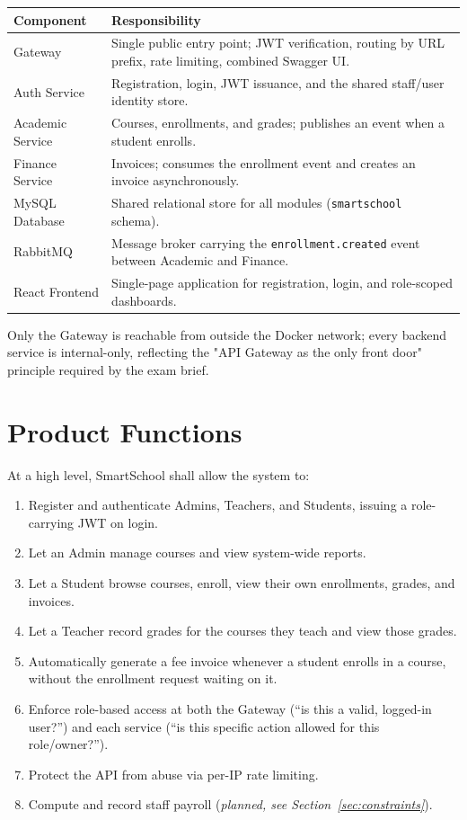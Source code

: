 \documentclass[11pt,a4paper]{report}
\newcommand{\sysname}{SmartSchool}
\begin{document}
\begin{center}
\begin{tabular}{@{}p{3.4cm}p{10.6cm}@{}}
\toprule
\textbf{Component} & \textbf{Responsibility} \\
\midrule
Gateway & Single public entry point; JWT verification, routing by URL prefix, rate limiting, combined Swagger UI. \\
Auth Service & Registration, login, JWT issuance, and the shared staff/user identity store. \\
Academic Service & Courses, enrollments, and grades; publishes an event when a student enrolls. \\
Finance Service & Invoices; consumes the enrollment event and creates an invoice asynchronously. \\
MySQL Database & Shared relational store for all modules (\texttt{smartschool} schema). \\
RabbitMQ & Message broker carrying the \texttt{enrollment.created} event between Academic and Finance. \\
React Frontend & Single-page application for registration, login, and role-scoped dashboards. \\
\bottomrule
\end{tabular}
\end{center}

Only the Gateway is reachable from outside the Docker network; every backend
service is internal-only, reflecting the "API Gateway as the only front
door" principle required by the exam brief.

\section{Product Functions}
At a high level, \sysname{} shall allow the system to:
\begin{enumerate}[itemsep=2pt]
    \item Register and authenticate Admins, Teachers, and Students, issuing a role-carrying JWT on login.
    \item Let an Admin manage courses and view system-wide reports.
    \item Let a Student browse courses, enroll, view their own enrollments, grades, and invoices.
    \item Let a Teacher record grades for the courses they teach and view those grades.
    \item Automatically generate a fee invoice whenever a student enrolls in a course, without the enrollment request waiting on it.
    \item Enforce role-based access at both the Gateway (``is this a valid, logged-in user?'') and each service (``is this specific action allowed for this role/owner?'').
    \item Protect the API from abuse via per-IP rate limiting.
    \item Compute and record staff payroll (\textit{planned, see Section~\ref{sec:constraints}}).
\end{enumerate}
\end{document}
